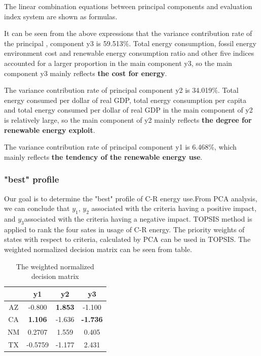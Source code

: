 \documentclass{mcmthesis}
\begin{document}
\begin{enumerate}
        The linear combination equations between principal components and evaluation index system are shown as formulas.

            It can be seen from the above expressions that the variance contribution rate of the principal , component y3 is 59.513$\%$. Total energy consumption, fossil energy environment cost and renewable energy consumption ratio and other five indices accounted for a larger proportion in the main component y3, so the main component y3 mainly reflects \textbf{the cost for energy}.

            The variance contribution rate of principal component y2 is 34.019$\%$.  Total energy consumed per dollar of real GDP, total energy consumption per capita and total energy consumed per dollar of real GDP in the main component of y2 is relatively large, so the main component of y2 mainly reflects \textbf{the degree for renewable energy exploit}.

            The variance contribution rate of principal component y1 is 6.468$\%$, which mainly reflects \textbf{the tendency of the renewable energy use}.
        \end{enumerate}

        \subsubsection{"best" profile}

       Our goal is to determine the "best" profile of C-R energy use.From PCA analysis, we can conclude that $y_{1}$, $y_{2}$ associated with the criteria having a positive impact, and $y_{3}$associated with the criteria having a negative  impact.
      TOPSIS method is applied to rank the four sates in usage of C-R energy. The priority weights of states with respect to criteria, calculated by PCA can be used in TOPSIS. The weighted normalized decision matrix can be seen from table.

      \begin{table}
      \centering
      \begin{tabular}{cccc}
      \hline
      {}&{y1}&{y2}&{y3}\\
      \hline
      {AZ}&-0.800&\textbf{1.853}&-1.100\\
      \hline
      {CA}&\textbf{1.106}&-1.636&\textbf{-1.736}\\
      \hline
      {NM}&0.2707&1.559&0.405\\
      \hline
      {TX}&-0.5759&-1.177&2.431\\
      \hline
      \end{tabular}
      \caption{The weighted normalized decision matrix}
      \end{table}
\end{document}
